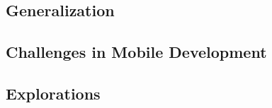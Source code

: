 \documentclass[11pt,english,numbers=endperiod,parskip=half]{scrartcl}
\begin{document}
  \subsection{Generalization}

  \subsection{Challenges in Mobile Development}

  \subsection{Explorations}
\end{document}
